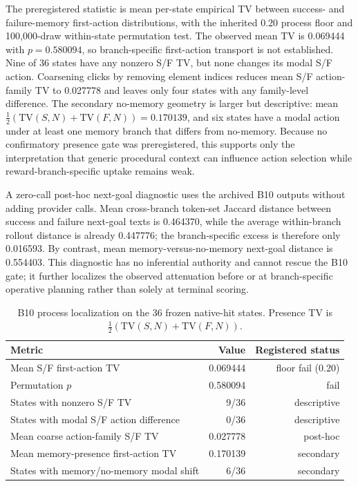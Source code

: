The preregistered statistic is mean per-state empirical TV between success- and failure-memory first-action distributions, with the inherited 0.20 process floor and 100,000-draw within-state permutation test. The observed mean TV is 0.069444 with $p=0.580094$, so branch-specific first-action transport is not established. Nine of 36 states have any nonzero S/F TV, but none changes its modal S/F action. Coarsening clicks by removing element indices reduces mean S/F action-family TV to 0.027778 and leaves only four states with any family-level difference. The secondary no-memory geometry is larger but descriptive: mean $\frac12(\mathrm{TV}(S,N)+\mathrm{TV}(F,N))=0.170139$, and six states have a modal action under at least one memory branch that differs from no-memory. Because no confirmatory presence gate was preregistered, this supports only the interpretation that generic procedural context can influence action selection while reward-branch-specific uptake remains weak.

A zero-call post-hoc next-goal diagnostic uses the archived B10 outputs without adding provider calls. Mean cross-branch token-set Jaccard distance between success and failure next-goal texts is 0.464370, while the average within-branch rollout distance is already 0.447776; the branch-specific excess is therefore only 0.016593. By contrast, mean memory-versus-no-memory next-goal distance is 0.554403. This diagnostic has no inferential authority and cannot rescue the B10 gate; it further localizes the observed attenuation before or at branch-specific operative planning rather than solely at terminal scoring.

\begin{table}[h]
\centering
\small
\caption{B10 process localization on the 36 frozen native-hit states. Presence TV is $\frac12(\mathrm{TV}(S,N)+\mathrm{TV}(F,N))$.}
\label{tab:b10-process}
\begin{tabular}{lrr}
\toprule
Metric & Value & Registered status \\
\midrule
Mean S/F first-action TV & 0.069444 & floor fail ($0.20$) \\
Permutation $p$ & 0.580094 & fail \\
States with nonzero S/F TV & 9/36 & descriptive \\
States with modal S/F action difference & 0/36 & descriptive \\
Mean coarse action-family S/F TV & 0.027778 & post-hoc \\
Mean memory-presence first-action TV & 0.170139 & secondary \\
States with memory/no-memory modal shift & 6/36 & secondary \\
\bottomrule
\end{tabular}
\end{table}

